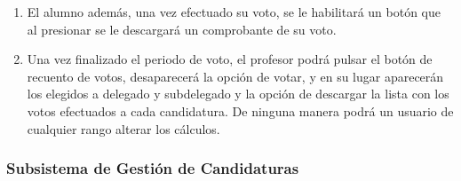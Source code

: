 \documentclass{article}
\begin{document}
\begin{enumerate}[label=\textbf{SGE-RF(\arabic*)}, labelwidth=25mm, labelsep=2mm, itemindent=0mm, leftmargin=*, align=parleft]
            \item El alumno además, una vez efectuado su voto, se le habilitará un botón que al presionar se le descargará un comprobante de su voto.

            \item Una vez finalizado el periodo de voto, el profesor podrá pulsar el botón de recuento de votos, desaparecerá la opción de votar, y en su lugar aparecerán los elegidos a delegado y subdelegado y la opción de descargar la lista con los votos efectuados a cada candidatura. De ninguna manera podrá un usuario de cualquier rango alterar los cálculos.
        \end{enumerate}

        \subsubsection{Subsistema de Gestión de Candidaturas}
\end{document}
